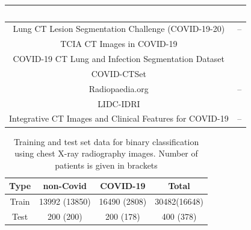 \documentclass[10pt,journal,compsoc]{IEEEtran}
\begin{document}
\begin{table}[!t]
\begin{tabular}{|c|c|}
&~\cite{zhang2020clinically}\\
\hline
 Lung CT Lesion Segmentation Challenge (COVID-19-20)

& --\\
\hline
 TCIA CT Images in COVID-19

&~\cite{an2020ct}\\
\hline
 COVID-19 CT Lung and Infection Segmentation Dataset

&~\cite{PPR:PPR346511}\\
\hline
 COVID-CTSet

&~\cite{rahimzadeh2020fully}\\
\hline
 Radiopaedia.org

&--\\
\hline
 LIDC-IDRI

&~\cite{armato2011lung}\\
\hline
 Integrative CT Images and Clinical Features for COVID-19

&--\\
\hline

\end{tabular}
\end{table}

\begin{table}
\renewcommand{\arraystretch}{1.3}
\caption{Training and test set data for binary classification using chest X-ray radiography images. Number of patients is given in brackets}
\label{table_2}
\centering
\begin{tabular}{|c|c|c|c|}
\hline
Type & non-Covid & COVID-19  & Total\\
\hline
Train & 13992 (13850) & 16490 (2808) & 30482(16648) \\
\hline
Test & 200 (200) & 200 (178) & 400 (378) \\
\hline
\end{tabular}
\end{table}
\end{document}
